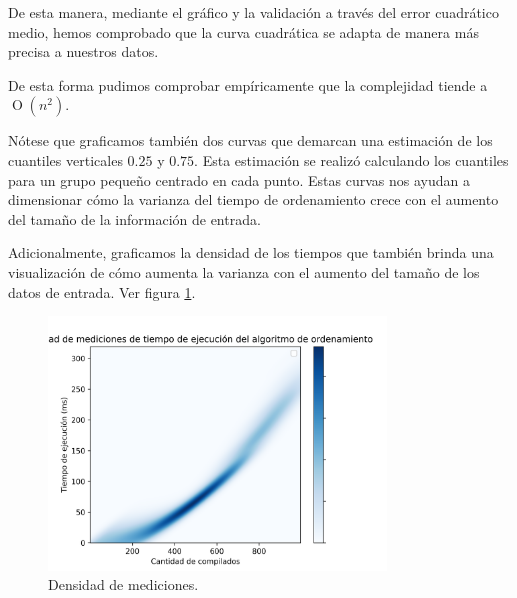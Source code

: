 De esta manera, mediante el gráfico y la validación a través del error cuadrático medio,
hemos comprobado que la curva cuadrática se adapta de manera más precisa a nuestros datos.

De esta forma pudimos comprobar empíricamente que la complejidad tiende a $\operatorname{O}(n^2)$.

Nótese que graficamos también dos curvas que demarcan una estimación de los cuantiles verticales $0.25$ y $0.75$. Esta estimación
se realizó calculando los cuantiles para un grupo pequeño centrado en cada punto. Estas curvas nos ayudan a dimensionar cómo la
varianza del tiempo de ordenamiento crece con el aumento del tamaño de la información de entrada.

Adicionalmente, graficamos la densidad de los tiempos que también brinda una visualización de cómo aumenta la varianza con el aumento del tamaño
de los datos de entrada. Ver figura \ref{fig:tiempos_densidad}. 

\begin{figure}[H]
    \centering
    \includegraphics[width=0.8\textwidth]{img/tiempos_densidad.png}
    \caption{Densidad de mediciones.}
    \label{fig:tiempos_densidad}
\end{figure}
